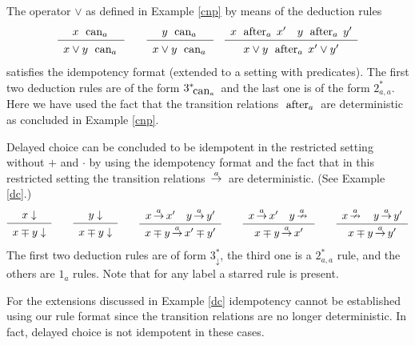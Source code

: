 \begin{example}
The operator $\lor$ as defined in Example \ref{cnp} by means of the deduction rules
\[
\sosrule{x \cando{a}}{x \lor y \cando{a}}
\qquad
\sosrule{y \cando{a}}{x \lor y \cando{a}}
\quad
\sosrule{x \after{a} x' \quad y \after{a} y'}{x \lor y  \after{a} x' \lor y'}
\]
satisfies the idempotency format (extended to a setting with predicates). The first two deduction rules are of the form $3^*_{\mathrel{\mbox{ can}_{a}\,}}$ and the last one is of the form $2^*_{a,a}$. Here we have used the fact that the transition relations $\mathrel{\mbox{ after}_{a}\,}$ are deterministic as concluded in Example \ref{cnp}.
\end{example}

\begin{example}
Delayed choice can be concluded to be idempotent in the restricted setting without $+$ and $\cdot$ by using the idempotency format and the fact that in this restricted setting the transition relations $\,{\stackrel{{a}}{\rightarrow}}\,$ are deterministic. (See Example \ref{dc}.)
\[
\sosrule{x \downarrow}{x \mp y \downarrow}
\qquad
\sosrule{y \downarrow}{x \mp y \downarrow}
\qquad
\sosrule{x \trans{a} x' \quad y \trans{a} y'}{x \mp y \trans{a} x' \mp y'}
\qquad
\sosrule{x \trans{a} x' \quad y \ntrans{a}}{x \mp y \trans{a} x'}
\qquad
\sosrule{x \ntrans{a} \quad y \trans{a} y'}{x \mp y \trans{a} y'}
\]
The first two deduction rules are of form $3^*_{\downarrow}$, the third one is a $2^*_{a,a}$ rule, and the others are $1_{a}$ rules. Note that for any label a starred rule is present.

For the extensions discussed in Example \ref{dc} idempotency cannot be established using our rule format
since the transition relations are no longer deterministic. In fact, delayed choice is not idempotent in these cases.
\end{example}
